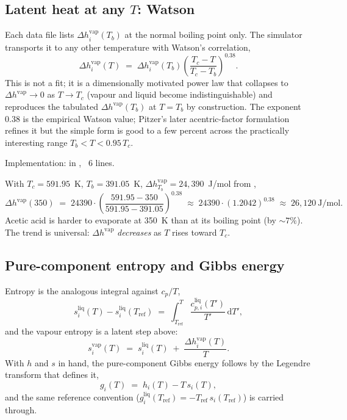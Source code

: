 \documentclass[11pt,a4paper]{article}
\begin{document}
\subsection{Latent heat at any $T$: Watson}

Each data file lists $\Delta h^{\mathrm{vap}}_i(T_b)$ at the normal
boiling point only.  The simulator transports it to any other
temperature with Watson's correlation,
\begin{equation}
   \boxed{\;
   \Delta h^{\mathrm{vap}}_i(T) \;=\; \Delta h^{\mathrm{vap}}_i(T_b)
     \left(\frac{T_c - T}{T_c - T_b}\right)^{0.38}.
   \;}
   \label{eq:integral-watson}
\end{equation}
This is not a fit; it is a dimensionally motivated power law that
collapses to $\Delta h^{\mathrm{vap}} \to 0$ as $T \to T_c$ (vapour
and liquid become indistinguishable) and reproduces the tabulated
$\Delta h^{\mathrm{vap}}(T_b)$ at $T = T_b$ by construction.  The
exponent $0.38$ is the empirical Watson value; Pitzer's later
acentric-factor formulation refines it but the simple form is good to
a few percent across the practically interesting range $T_b < T <
0.95\,T_c$.

Implementation:  in
, ~6 lines.

\begin{example}[Acetic acid latent heat at $T = 350$~K]
With $T_c = 591.95$~K, $T_b = 391.05$~K, $\Delta h^{\mathrm{vap}}_{T_b}
= 24{,}390$~J/mol from ,
\[
   \Delta h^{\mathrm{vap}}(350)
   \;=\; 24390 \cdot
   \left(\frac{591.95 - 350}{591.95 - 391.05}\right)^{0.38}
   \;\approx\; 24390 \cdot (1.2042)^{0.38}
   \;\approx\; 26{,}120~\mathrm{J/mol}.
\]
Acetic acid is harder to evaporate at 350~K than at its boiling point
(by $\sim 7\%$).  The trend is universal: $\Delta h^{\mathrm{vap}}$
\emph{decreases} as $T$ rises toward $T_c$.
\end{example}

\subsection{Pure-component entropy and Gibbs energy}

Entropy is the analogous integral against $c_p / T$,
\begin{equation}
   s^{\mathrm{liq}}_i(T) - s^{\mathrm{liq}}_i(T_{\mathrm{ref}})
   \;=\; \int_{T_{\mathrm{ref}}}^{T} \frac{c_{p,i}^{\mathrm{liq}}(T')}{T'}\,\mathrm{d}T',
\end{equation}
and the vapour entropy is a latent step above:
\begin{equation}
   s^{\mathrm{vap}}_i(T) \;=\; s^{\mathrm{liq}}_i(T) \;+\;
   \frac{\Delta h^{\mathrm{vap}}_i(T)}{T}.
\end{equation}
With $h$ and $s$ in hand, the pure-component Gibbs energy follows by
the Legendre transform that defines it,
\begin{equation}
   g_i(T) \;=\; h_i(T) - T\,s_i(T),
\end{equation}
and the same reference convention ($g^{\mathrm{liq}}_i(T_{\mathrm{ref}})
= -T_{\mathrm{ref}}\,s_i(T_{\mathrm{ref}})$) is carried through.
\end{document}
